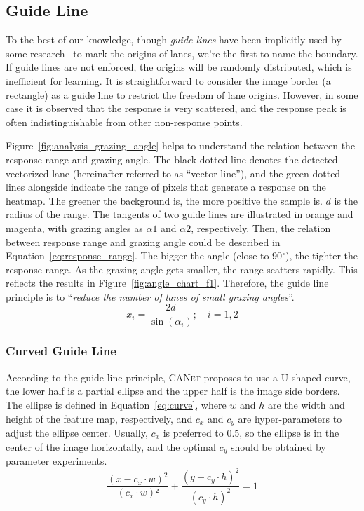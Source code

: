 \documentclass{article}
\newcommand\self{\textsc{CANet}\xspace}
\begin{document}
\subsection{Guide Line}
\label{sec:guide-line}
To the best of our knowledge, though \emph{guide lines} have been implicitly
used by some research~\cite{condlanenet} to mark the origins of lanes, we're the
first to name the boundary. If guide lines are not enforced, the origins will be
randomly distributed, which is inefficient for learning. It is straightforward
to consider the image border (a rectangle) as a guide line to restrict the
freedom of lane origins. However, in some case it is observed that the response
is very scattered, and the response peak is often indistinguishable from other
non-response points.

Figure~\ref{fig:analysis_grazing_angle} helps to understand the relation between
the response range and grazing angle. The black dotted line denotes the detected
vectorized lane (hereinafter referred to as ``vector line''), and the green
dotted lines alongside indicate the range of pixels that generate a response on
the heatmap. The greener the background is, the more positive the sample is. $d$
is the radius of the range. The tangents of two guide lines are illustrated in
orange and magenta, with grazing angles as $\alpha1$ and $\alpha2$,
respectively. Then, the relation between response range and grazing angle could
be described in Equation~\eqref{eq:response_range}. The bigger the angle (close
to 90$^{\circ}$), the tighter the response range. As the grazing angle gets
smaller, the range scatters rapidly. This reflects the results in
Figure~\ref{fig:angle_chart_f1}. Therefore, the guide line principle is to
``\emph{reduce the number of lanes of small grazing angles}''.
\begin{equation}
  \label{eq:response_range}
  x_i = \frac{2d}{\sin(\alpha_i)}; \quad i=1, 2
\end{equation}


\subsubsection{Curved Guide Line}
\label{sec:curved-guide-line}
According to the guide line principle, \self proposes to use a U-shaped curve,
the lower half is a partial ellipse and the upper half is the image side
borders. The ellipse is defined in Equation~\eqref{eq:curve}, where $w$ and $h$
are the width and height of the feature map, respectively, and $c_x$ and $c_y$
are hyper-parameters to adjust the ellipse center. Usually, $c_x$ is preferred
to 0.5, so the ellipse is in the center of the image horizontally, and the
optimal $c_y$ should be obtained by parameter experiments.
\begin{equation}
  \label{eq:curve}
    \frac{(x-c_x\cdot w)^2}{(c_x\cdot w)²} + \frac{(y-c_y \cdot h)^2}{(c_y\cdot h)^{2}} = 1
\end{equation}
\end{document}
